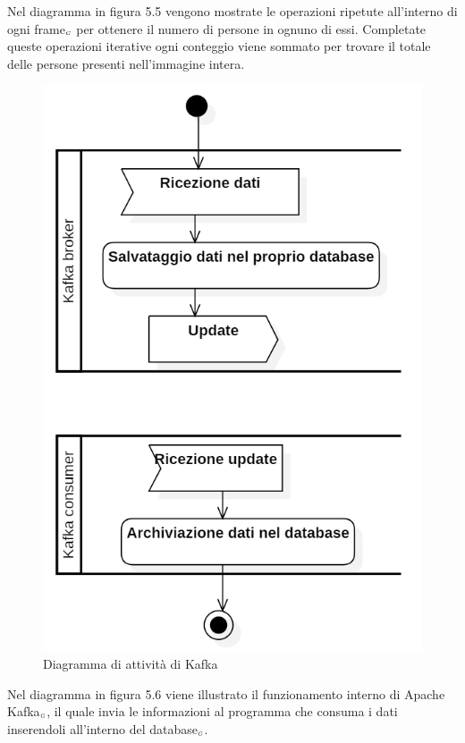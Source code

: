 Nel diagramma in figura 5.5 vengono mostrate le operazioni ripetute all'interno di ogni frame$_{\scaleto{G}{3pt}}$ per ottenere il numero di persone in ognuno di essi. Completate queste operazioni iterative ogni conteggio viene sommato per trovare il totale delle persone presenti nell'immagine intera.
\begin{figure}[H]
  \begin{center}
    \includegraphics[scale=0.4]{../immagini/diag_PB/kafka.png}
    \caption{Diagramma di attività di Kafka}
  \end{center}
\end{figure}
Nel diagramma in figura 5.6 viene illustrato il funzionamento interno di Apache Kafka$_{\scaleto{G}{3pt}}$, il quale invia le informazioni al programma che consuma i dati inserendoli all'interno del database$_{\scaleto{G}{3pt}}$.

